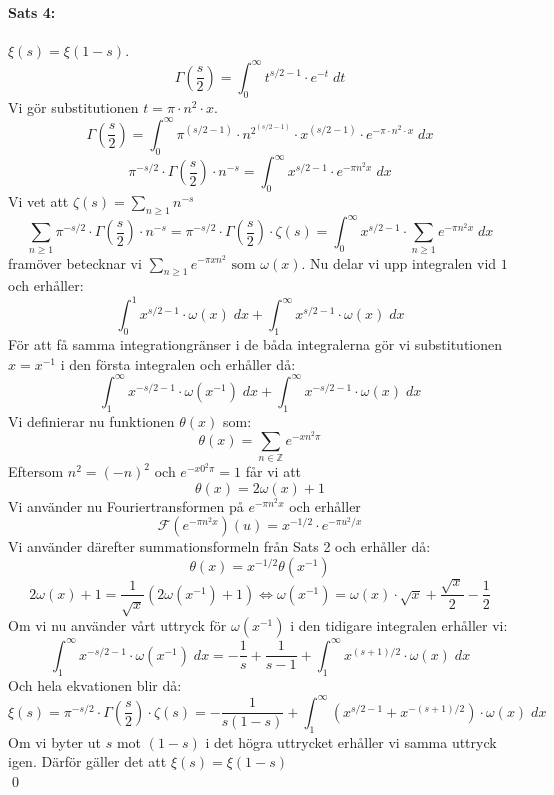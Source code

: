 \documentclass{article}%
\begin{document}
\paragraph{Sats 4:} $\xi(s) = \xi(1 - s)$.\\
$$\Gamma(\frac s 2) = \int_0^\infty t^{s/2 - 1} \cdot e^{-t}\; dt$$
Vi gör substitutionen $t = \pi \cdot n^2 \cdot x$.
$$\Gamma(\frac s 2) = \int_0^\infty \pi^{(s/2 - 1)} \cdot n^{2^{(s / 2 - 1)}} \cdot x^{(s/2 - 1)} \cdot e^{-\pi \cdot
n^2 \cdot x}\; dx$$
$$\pi^{-s/2} \cdot \Gamma(\frac s 2) \cdot n^{-s} = \int_0^\infty x^{s/2 - 1} \cdot e^{-\pi n^2 x}\; dx$$
Vi vet att $\zeta(s) = \sum\limits_{n \ge 1} n^{-s}$
$$\sum_{n \ge 1} \pi^{-s/2} \cdot \Gamma(\frac s 2) \cdot n^{-s} = \pi^{-s/2} \cdot \Gamma(\frac s 2) \cdot \zeta(s) = 
\int_0^\infty x^{s/2 - 1} \cdot \sum_{n \ge 1} e^{-\pi n^2 x}\; dx$$
framöver betecknar vi $\sum\limits_{n \ge 1} e^{-\pi x n^2} \text{ som } \omega(x)$.
Nu delar vi upp integralen vid $1$ och erhåller:%
$$\int_0^1 x^{s/2 - 1} \cdot \omega(x)\; dx + \int_1^\infty x^{s/2 - 1} \cdot \omega(x)\; dx$$
För att få samma integrationgränser i de båda integralerna gör vi substitutionen $x = x^{-1}$ i den första integralen och erhåller då:
$$\int_1^\infty x^{-s/2 - 1} \cdot \omega(x^{-1})\; dx + \int_1^\infty x^{-s/2 - 1} \cdot \omega(x)\; dx$$
Vi definierar nu funktionen $\theta(x)$ som:
$$\theta(x) = \sum_{n \in \mathbb{Z}} e^{-xn^2\pi}$$
Eftersom $n^2=(-n)^2$ och $e^{-x0^2\pi} = 1$ får vi att 
$$\theta(x) = 2\omega(x) + 1$$%
Vi använder nu Fouriertransformen på $e^{-\pi n^2 x}$ och erhåller
$$\mathcal{F}(e^{-\pi n^2 x})(u) = x^{-1/2} \cdot e^{-\pi u^2/x}$$
Vi använder därefter summationsformeln från Sats 2 och erhåller då:
$$\theta(x) = x^{-1/2}\theta(x^{-1})$$
$$2\omega(x) + 1 = \frac 1 {\sqrt{x}} (2\omega(x^{-1}) + 1) \Leftrightarrow \omega(x^{-1}) = \omega(x) \cdot \sqrt{x} + \frac {\sqrt{x}} 2
- \frac 1 2$$
Om vi nu använder vårt uttryck för $\omega(x^{-1})$ i den tidigare integralen erhåller vi:
$$\int_1^\infty x^{-s/2 - 1} \cdot \omega(x^{-1})\; dx = - \frac 1 s + \frac 1 {s - 1} + \int_1^\infty x^{(s + 1)/2} \cdot \omega(x)\; dx$$
Och hela ekvationen blir då:
$$\xi(s) = \pi^{-s/2} \cdot \Gamma(\frac s 2) \cdot \zeta(s) = - \frac 1 {s(1 - s)} + \int_1^\infty(x^{s/2 - 1} + x^{-(s + 1)/2}) \cdot
\omega(x)\; dx$$
Om vi byter ut $s$ mot $(1 - s)$ i det högra uttrycket erhåller vi samma uttryck igen. Därför gäller det att $\xi(s) = \xi(1 - s)$ \\
\hfill \qed
\end{document}
